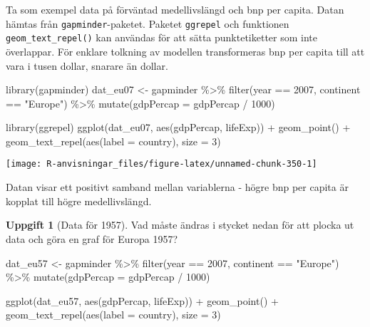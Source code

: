 \documentclass[
]{book}
\newenvironment{Shaded}{\begin{snugshade}}{\end{snugshade}}
\newcommand{\AttributeTok}[1]{\textcolor[rgb]{0.77,0.63,0.00}{#1}}
\newcommand{\DecValTok}[1]{\textcolor[rgb]{0.00,0.00,0.81}{#1}}
\newcommand{\FunctionTok}[1]{\textcolor[rgb]{0.00,0.00,0.00}{#1}}
\newcommand{\NormalTok}[1]{#1}
\newcommand{\OtherTok}[1]{\textcolor[rgb]{0.56,0.35,0.01}{#1}}
\newcommand{\SpecialCharTok}[1]{\textcolor[rgb]{0.00,0.00,0.00}{#1}}
\newcommand{\StringTok}[1]{\textcolor[rgb]{0.31,0.60,0.02}{#1}}
\theoremstyle{definition}
\theoremstyle{definition}
\theoremstyle{definition}
\newtheorem{exercise}{Uppgift}[chapter]
\theoremstyle{definition}
\theoremstyle{remark}
\begin{document}
Ta som exempel data på förväntad medellivslängd och bnp per capita. Datan hämtas från \texttt{gapminder}-paketet. Paketet \texttt{ggrepel} och funktionen \texttt{geom\_text\_repel()} kan användas för att sätta punktetiketter som inte överlappar. För enklare tolkning av modellen transformeras bnp per capita till att vara i tusen dollar, snarare än dollar.

\begin{Shaded}
\begin{Highlighting}[]
\FunctionTok{library}\NormalTok{(gapminder)}
\NormalTok{dat\_eu07 }\OtherTok{\textless{}{-}}\NormalTok{ gapminder }\SpecialCharTok{\%\textgreater{}\%} 
  \FunctionTok{filter}\NormalTok{(year }\SpecialCharTok{==} \DecValTok{2007}\NormalTok{, continent }\SpecialCharTok{==} \StringTok{"Europe"}\NormalTok{) }\SpecialCharTok{\%\textgreater{}\%} 
  \FunctionTok{mutate}\NormalTok{(}\AttributeTok{gdpPercap =}\NormalTok{ gdpPercap }\SpecialCharTok{/} \DecValTok{1000}\NormalTok{)}

\FunctionTok{library}\NormalTok{(ggrepel)}
\FunctionTok{ggplot}\NormalTok{(dat\_eu07, }\FunctionTok{aes}\NormalTok{(gdpPercap, lifeExp)) }\SpecialCharTok{+}
  \FunctionTok{geom\_point}\NormalTok{() }\SpecialCharTok{+}
  \FunctionTok{geom\_text\_repel}\NormalTok{(}\FunctionTok{aes}\NormalTok{(}\AttributeTok{label =}\NormalTok{ country), }\AttributeTok{size =} \DecValTok{3}\NormalTok{)}
\end{Highlighting}
\end{Shaded}

\begin{center}\texttt{[image: R-anvisningar\_files/figure-latex/unnamed-chunk-350-1]} \end{center}

Datan visar ett positivt samband mellan variablerna - högre bnp per capita är kopplat till högre medellivslängd.

\begin{exercise}[Data för 1957]

Vad måste ändras i stycket nedan för att plocka ut data och göra en graf för Europa 1957?

\begin{Shaded}
\begin{Highlighting}[]
\NormalTok{dat\_eu57 }\OtherTok{\textless{}{-}}\NormalTok{ gapminder }\SpecialCharTok{\%\textgreater{}\%} 
  \FunctionTok{filter}\NormalTok{(year }\SpecialCharTok{==} \DecValTok{2007}\NormalTok{, continent }\SpecialCharTok{==} \StringTok{"Europe"}\NormalTok{) }\SpecialCharTok{\%\textgreater{}\%} 
  \FunctionTok{mutate}\NormalTok{(}\AttributeTok{gdpPercap =}\NormalTok{ gdpPercap }\SpecialCharTok{/} \DecValTok{1000}\NormalTok{)}

\FunctionTok{ggplot}\NormalTok{(dat\_eu57, }\FunctionTok{aes}\NormalTok{(gdpPercap, lifeExp)) }\SpecialCharTok{+}
  \FunctionTok{geom\_point}\NormalTok{() }\SpecialCharTok{+}
  \FunctionTok{geom\_text\_repel}\NormalTok{(}\FunctionTok{aes}\NormalTok{(}\AttributeTok{label =}\NormalTok{ country), }\AttributeTok{size =} \DecValTok{3}\NormalTok{)}
\end{Highlighting}
\end{Shaded}

\end{exercise}
\end{document}
